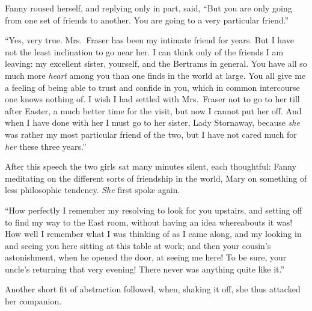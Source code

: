Fanny roused herself, and replying only in part, said,
``But you are only going from one set of friends to another.
You are going to a very particular friend.''

``Yes, very true.  Mrs.\ Fraser has been my intimate friend
for years.  But I have not the least inclination to go
near her.  I can think only of the friends I am leaving:
my excellent sister, yourself, and the Bertrams in general.
You have all so much more \emph{heart} among you than one
finds in the world at large.  You all give me a feeling
of being able to trust and confide in you, which in common
intercourse one knows nothing of.  I wish I had settled
with Mrs.\ Fraser not to go to her till after Easter, a much
better time for the visit, but now I cannot put her off.
And when I have done with her I must go to her sister,
Lady Stornaway, because \emph{she} was rather my most particular
friend of the two, but I have not cared much for \emph{her}
these three years.''

After this speech the two girls sat many minutes silent,
each thoughtful:  Fanny meditating on the different sorts
of friendship in the world, Mary on something of less
philosophic tendency.  \emph{She} first spoke again.

``How perfectly I remember my resolving to look for
you upstairs, and setting off to find my way to the
East room, without having an idea whereabouts it was!
How well I remember what I was thinking of as I came along,
and my looking in and seeing you here sitting at this
table at work; and then your cousin's astonishment,
when he opened the door, at seeing me here!  To be sure,
your uncle's returning that very evening!  There never
was anything quite like it.''

Another short fit of abstraction followed, when,
shaking it off, she thus attacked her companion.

